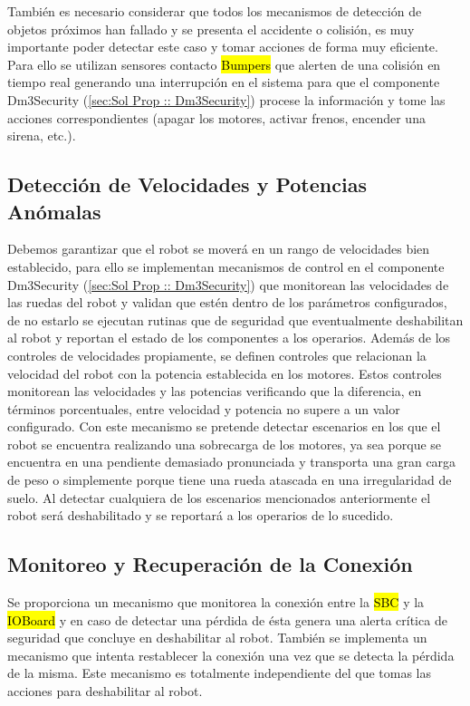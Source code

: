 \documentclass[withindex,glossary]{cam-thesis}
\begin{document}
También es necesario considerar que todos los mecanismos de detección de objetos próximos han fallado y se presenta el accidente o colisión, es muy importante poder detectar este caso y tomar acciones de forma muy eficiente. Para ello se utilizan sensores contacto \hl{Bumpers} que alerten de una colisión en tiempo real generando una interrupción en el sistema para que el componente Dm3Security (\ref{sec:Sol Prop :: Dm3Security}) procese la información y tome las acciones correspondientes (apagar los motores, activar frenos, encender una sirena, etc.).

\subsection{Detección de Velocidades y Potencias Anómalas} \label{sec:Sol Prop :: detección de velocidades y potencias anómalas}
Debemos garantizar que el robot se moverá en un rango de velocidades bien establecido, para ello se implementan mecanismos de control en el componente Dm3Security (\ref{sec:Sol Prop :: Dm3Security}) que monitorean las velocidades de las ruedas del robot y validan que estén dentro de los parámetros configurados, de no estarlo se ejecutan rutinas que de seguridad que eventualmente deshabilitan al robot y reportan el estado de los componentes a los operarios.
Además de los controles de velocidades propiamente, se definen controles que relacionan la velocidad del robot con la potencia establecida en los motores. Estos controles monitorean las velocidades y las potencias verificando que la diferencia, en términos porcentuales, entre velocidad y potencia no supere a un valor configurado. Con este mecanismo se pretende detectar escenarios en los que el robot se encuentra realizando una sobrecarga de los motores, ya sea porque se encuentra en una pendiente demasiado pronunciada y transporta una gran carga de peso o simplemente porque tiene una rueda atascada en una irregularidad de suelo.
Al detectar cualquiera de los escenarios mencionados anteriormente el robot será deshabilitado y se reportará a los operarios de lo sucedido.

\subsection{Monitoreo y Recuperación de la Conexión} \label{sec:Sol Prop :: monitoreo y recuperación de la conexión}
Se proporciona un mecanismo que monitorea la conexión entre la \hl{SBC} y la \hl{IOBoard} y en caso de detectar una pérdida de ésta genera una alerta crítica de seguridad que concluye en deshabilitar al robot. También se implementa un mecanismo que intenta restablecer la conexión una vez que se detecta la pérdida de la misma. Este mecanismo es totalmente independiente del que tomas las acciones para deshabilitar al robot.
\end{document}

